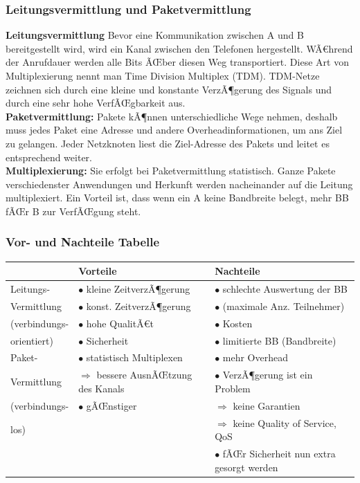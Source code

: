 \documentclass[a4paper,10pt]{article}
\newcommand{\Bold}[1]{\textbf{#1}} %
\newcommand{\Ra}{\Rightarrow}
\begin{document}
\subsubsection{Leitungsvermittlung und Paketvermittlung}
\Bold{Leitungsvermittlung}  Bevor eine Kommunikation zwischen A und B bereitgestellt wird, wird ein Kanal zwischen den Telefonen hergestellt. WÃ€hrend der Anrufdauer werden alle Bits ÃŒber diesen Weg transportiert. Diese Art von Multiplexierung nennt man Time Division Multiplex (TDM). TDM-Netze zeichnen sich durch eine kleine und konstante VerzÃ¶gerung des Signals und durch eine sehr hohe VerfÃŒgbarkeit aus.\\
\Bold{Paketvermittlung:} Pakete kÃ¶nnen unterschiedliche Wege nehmen, deshalb muss jedes Paket eine Adresse und andere Overheadinformationen, um ans Ziel zu gelangen. Jeder Netzknoten liest die Ziel-Adresse des Pakets und leitet es entsprechend weiter.\\
\Bold{Multiplexierung:} Sie erfolgt bei Paketvermittlung statistisch. Ganze Pakete verschiedenster Anwendungen und Herkunft werden nacheinander auf die Leitung multiplexiert. Ein Vorteil ist, dass wenn ein A keine Bandbreite belegt, mehr BB fÃŒr B zur VerfÃŒgung steht.
\subsubsection*{Vor- und Nachteile Tabelle}
\begin{tabular}{|l|l|l|}
 \hline
 &Vorteile&Nachteile\\\hline
 Leitungs-&$\bullet$ kleine ZeitverzÃ¶gerung&$\bullet$ schlechte Auswertung der BB\\
 Vermittlung&$\bullet$ konst. ZeitverzÃ¶gerung&$\bullet$ (maximale Anz. Teilnehmer)\\
 (verbindungs-&$\bullet$ hohe QualitÃ€t&$\bullet$ Kosten\\
 orientiert)&$\bullet$ Sicherheit&$\bullet$ limitierte BB (Bandbreite)\\\hline
 Paket-&$\bullet$ statistisch Multiplexen&$\bullet$ mehr Overhead\\
 Vermittlung&$\Ra$ bessere AusnÃŒtzung des Kanals&$\bullet$ VerzÃ¶gerung ist ein Problem\\
 (verbindungs-&$\bullet$ gÃŒnstiger&$\Ra$ keine Garantien\\
 los)&&$\Ra$ keine Quality of Service, QoS\\
 &&$\bullet$ fÃŒr Sicherheit nun extra gesorgt werden\\\hline
\end{tabular}
\end{document}
